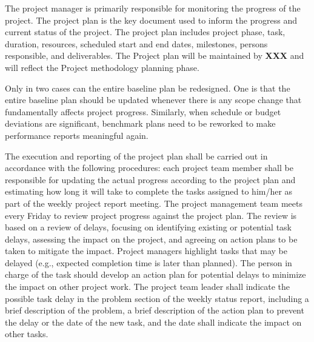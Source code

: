 The project manager is primarily responsible for monitoring the progress of the project. The project plan is the key document used to inform the progress and current status of the project. The project plan includes project phase, task, duration, resources, scheduled start and end dates, milestones, persons responsible, and deliverables. The Project plan will be maintained by \textbf{XXX} and will reflect the Project methodology planning phase.

Only in two cases can the entire baseline plan be redesigned. One is that the entire baseline plan should be updated whenever there is any scope change that fundamentally affects project progress. Similarly, when schedule or budget deviations are significant, benchmark plans need to be reworked to make performance reports meaningful again.

The execution and reporting of the project plan shall be carried out in accordance with the following procedures: each project team member shall be responsible for updating the actual progress according to the project plan and estimating how long it will take to complete the tasks assigned to him/her as part of the weekly project report meeting. The project management team meets every Friday to review project progress against the project plan. The review is based on a review of delays, focusing on identifying existing or potential task delays, assessing the impact on the project, and agreeing on action plans to be taken to mitigate the impact. Project managers highlight tasks that may be delayed (e.g., expected completion time is later than planned). The person in charge of the task should develop an action plan for potential delays to minimize the impact on other project work. The project team leader shall indicate the possible task delay in the problem section of the weekly status report, including a brief description of the problem, a brief description of the action plan to prevent the delay or the date of the new task, and the date shall indicate the impact on other tasks.